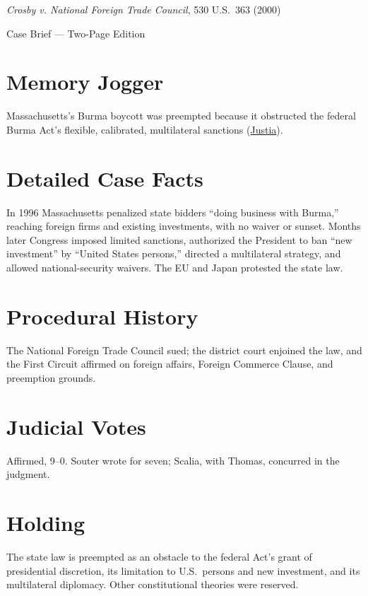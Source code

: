 \documentclass[12pt]{article}
\begin{document}
\begin{center}
{\LARGE \textit{Crosby v. National Foreign Trade Council}, 530 U.S.\ 363 (2000)\par}
\vspace{0.5em}
{\large Case Brief --- Two-Page Edition\par}
\end{center}

\section{Memory Jogger}
Massachusetts's Burma boycott was preempted because it obstructed the federal Burma Act's flexible, calibrated, multilateral sanctions (\href{https://supreme.justia.com/cases/federal/us/530/363/}{Justia}).

\section{Detailed Case Facts}
In 1996 Massachusetts penalized state bidders ``doing business with Burma,'' reaching foreign firms and existing investments, with no waiver or sunset. Months later Congress imposed limited sanctions, authorized the President to ban ``new investment'' by ``United States persons,'' directed a multilateral strategy, and allowed national-security waivers. The EU and Japan protested the state law.

\section{Procedural History}
The National Foreign Trade Council sued; the district court enjoined the law, and the First Circuit affirmed on foreign affairs, Foreign Commerce Clause, and preemption grounds.

\section{Judicial Votes}
Affirmed, 9--0. Souter wrote for seven; Scalia, with Thomas, concurred in the judgment.

\section{Holding}
The state law is preempted as an obstacle to the federal Act's grant of presidential discretion, its limitation to U.S.\ persons and new investment, and its multilateral diplomacy. Other constitutional theories were reserved.
\end{document}
